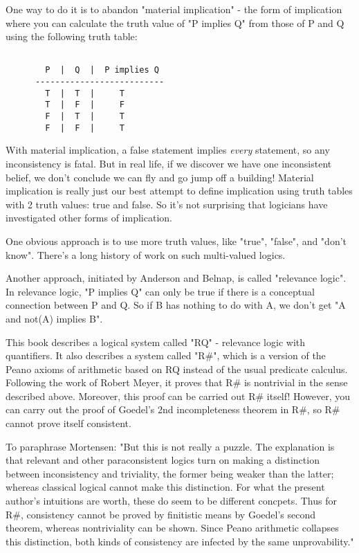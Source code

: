 One way to do it is to abandon "material implication" - the form of
implication where you can calculate the truth value of "P implies Q"
from those of P and Q using the following truth table:

\begin{verbatim}

        P  |  Q  |  P implies Q
      --------------------------
        T  |  T  |     T
        T  |  F  |     F
        F  |  T  |     T
        F  |  F  |     T
\end{verbatim}
    
With material implication, a false statement implies \emph{every} statement, 
so any inconsistency is fatal.  But in real life, if we discover we have
one inconsistent belief, we don't conclude we can fly and go jump off a
building!  Material implication is really just our best attempt to define
implication using truth tables with 2 truth values: true and false.  So
it's not surprising that logicians have investigated other forms of
implication.  

One obvious approach is to use more truth values, like "true",
"false", and "don't know".  There's a long history
of work on such multi-valued logics.

Another approach, initiated by Anderson and Belnap, is called
"relevance logic".  In relevance logic, "P implies
Q" can only be true if there is a conceptual connection between P
and Q.  So if B has nothing to do with A, we don't get "A and
not(A) implies B".

This book describes a logical system called "RQ" - relevance
logic with quantifiers.  It also describes a system called
"R#", which is a version of the Peano axioms of arithmetic
based on RQ instead of the usual predicate calculus.  Following the work
of Robert Meyer, it proves that R# is nontrivial in the sense described
above.  Moreover, this proof can be carried out R# itself!  However, you
can carry out the proof of Goedel's 2nd incompleteness theorem in R#, so
R# cannot prove itself consistent.

To paraphrase Mortensen: "But this is not really a puzzle.  The
explanation is that relevant and other paraconsistent logics turn on
making a distinction between inconsistency and triviality, the former
being weaker than the latter; whereas classical logical cannot make this
distinction.  For what the present author's intuitions are worth, these
do seem to be different concpets.  Thus for R#, consistency cannot be
proved by finitistic means by Goedel's second theorem, whereas
nontriviality can be shown.  Since Peano arithmetic collapses this
distinction, both  kinds of consistency are infected by the same
unprovability."

